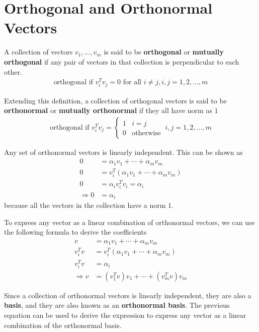 \documentclass[../../linear_algebra.tex]{subfiles}
\begin{document}
\section{Orthogonal and Orthonormal Vectors}
A collection of vectors $v_{1}, \ldots, v_{m}$ is said to be \textbf{orthogonal} or \textbf{mutually orthogonal} if any pair of vectors in that collection is perpendicular to each other.
\begin{align*}
    \text{orthogonal if } v_{i}^{T}v_{j} = 0 \text{ for all } i \neq j, i,j = 1,2,\ldots, m
\end{align*}

Extending this definition, a collection of orthogonal vectors is said to be \textbf{orthonormal} or \textbf{mutually orthonormal} if they all have norm as $1$
\begin{align*}
    \text{orthogonal if } v_{i}^{T}v_{j} = \begin{cases} 1 &\mbox{$i = j$}\\ 0 &\mbox{otherwise} \end{cases} \: i,j = 1,2,\ldots, m
\end{align*}

Any set of orthonormal vectors is linearly independent. This can be shown as
\begin{align*}
    0 &= \alpha_{1}v_{1} + \cdots + \alpha_{m}v_{m}\\
    0 &= v_{i}^{T}(\alpha_{1}v_{1} + \cdots + \alpha_{m}v_{m})\\
    0 &= \alpha_{i}v_{i}^{T}v_{i} = \alpha_{i}\\
    \Rightarrow 0 &= \alpha_{i}
\end{align*}
because all the vectors in the collection have a norm $1$.\newline

To express any vector as a linear combination of orthonormal vectors, we can use the following formula to derive the coefficients
\begin{align*}
    v &= \alpha_{1}v_{1} + \cdots + \alpha_{m}v_{m}\\
    v_{i}^{T}v &= v_{i}^{T}(\alpha_{1}v_{1} + \cdots + \alpha_{m}v_{m})\\
    v_{i}^{T}v &= \alpha_{i}\\
    \Rightarrow v &= (v_{1}^{T}v)v_{1} + \cdots + (v_{m}^{T}v)v_{m}
\end{align*}

Since a collection of orthonormal vectors is linearly independent, they are also a \textbf{basis}, and they are also known as an \textbf{orthonormal basis}. The previous equation can be used to derive the expression to express any vector as a linear combination of the orthonormal basis.
\end{document}
